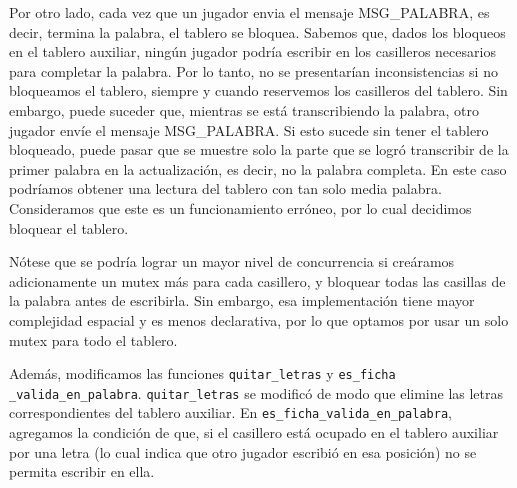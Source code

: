 Por otro lado, cada vez que un jugador envia el mensaje MSG\_PALABRA, es decir, termina la palabra, el tablero se bloquea. Sabemos que,
dados los bloqueos en el tablero auxiliar, ning\'un jugador podr\'ia escribir en los casilleros necesarios para completar la palabra. Por lo tanto,
no se presentar\'ian inconsistencias si no bloqueamos el tablero, siempre y cuando reservemos los casilleros del tablero. Sin embargo, puede suceder que,
mientras se est\'a transcribiendo la palabra, otro jugador env\'ie el mensaje MSG\_PALABRA. Si esto sucede sin tener el tablero bloqueado, puede pasar que 
se muestre solo la parte que se logr\'o transcribir de la primer palabra en la actualizaci\'on, es decir, no la palabra completa. En este caso podr\'iamos
obtener una lectura del tablero con tan solo media palabra. Consideramos que este es un funcionamiento err\'oneo, por lo cual decidimos bloquear el tablero.

N\'otese que se podr\'ia lograr un mayor nivel de concurrencia si cre\'aramos adicionamente un mutex m\'as para cada casillero, y bloquear todas las casillas
de la palabra antes de escribirla. Sin embargo, esa implementaci\'on tiene mayor complejidad espacial y es menos declarativa, por lo que optamos por usar 
un solo mutex para todo el tablero.

Adem\'as, modificamos las funciones \verb|quitar_letras| y \verb|es_ficha _valida_en_palabra|.
\verb|quitar_letras| se modific\'o de modo que elimine las letras correspondientes del tablero auxiliar.
En \verb|es_ficha_valida_en_palabra|, agregamos la condici\'on de que, si el casillero est\'a ocupado en el tablero auxiliar por una letra  
(lo cual indica que otro jugador escribi\'o en esa posici\'on) no se permita escribir en ella. 